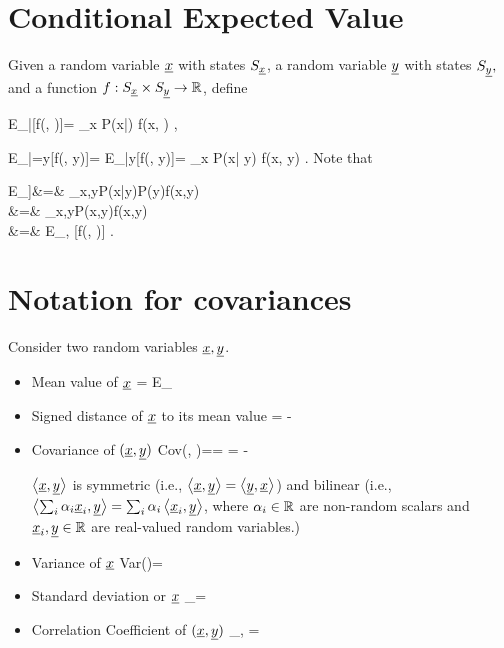 \section{Conditional Expected Value}

Given a random variable ${\underline{x}}$ with states $S_{\underline{x}}$, a random variable ${\underline{y}}$ with states $S_{\underline{y}},$ and a function $f:S_{\underline{x}}\times S_{\underline{y}}\rightarrow { \mathbb{R}}$, define

\beq
E_{\rvx|\rvy}[f(\rvx, \rvy)]=
\sum_x P(x|\rvy) f(x, \rvy)
\;,
\eeq

\beq
E_{\rvx|\rvy=y}[f(\rvx, y)]=
E_{\rvx|y}[f(\rvx, y)]= \sum_x P(x| y) f(x, y)
\;.
\eeq
Note that

\beqa
E_\rvy[E_{\rvx|\rvy}[f(\rvx, \rvy)]]&=&
\sum_{x,y}P(x|y)P(y)f(x,y)
\\&=&
\sum_{x,y}P(x,y)f(x,y)
\\&=&
E_{\rvx, \rvy}[f(\rvx, \rvy)]
\;.
\eeqa



\section{Notation
for covariances}
Consider two random variables ${\underline{x}}, {\underline{y}}$.

\begin{itemize}
\item
Mean value of ${\underline{x}}$
\beq
\av{\rvx}=
E_\rvx[\rvx]
\eeq

\item
Signed distance of ${\underline{x}}$ to its mean value
\beq
\Delta \rvx = \rvx - \av{\rvx}
\eeq

\item
Covariance of $({\underline{x}}, {\underline{y}})$
\beq
Cov(\rvx, \rvy)=\av{\rvx, \rvy}=
\av{\Delta \rvx \Delta \rvy}
=
\av{\rvx\rvy}-\av{\rvx}\av{\rvy}
\eeq

$\left\langle{\underline{x}}, {\underline{y}}\right\rangle$ is symmetric 
(i.e., $\left\langle{\underline{x}}, {\underline{y}}\right\rangle=\left\langle{\underline{y}}, {\underline{x}}\right\rangle$)
and bilinear (i.e.,
$\left\langle\sum_i \alpha_i{\underline{x}}_i, {\underline{y}}\right\rangle
=
\sum_i\alpha_i\left\langle{\underline{x}}_i, {\underline{y}}\right\rangle$, where
$\alpha_i\in { \mathbb{R}}$
are non-random scalars
and ${\underline{x}}_i, {\underline{y}}\in{ \mathbb{R}}$ are 
real-valued random
variables.)

\item
Variance of ${\underline{x}}$
\beq
Var(\rvx)=\av{\rvx, \rvx}
\eeq

\item
Standard deviation or ${\underline{x}}$
\beq
\sigma_\rvx=\sqrt{\av{\rvx, \rvx}}
\eeq

\item
Correlation Coefficient of $({\underline{x}}, {\underline{y}})$
\beq
\rho_{\rvx, \rvy}=
\frac{\av{\rvx, \rvy}}
{\sqrt{\av{\rvx, \rvx}\av{\rvy, \rvy}}}
\eeq
\end{itemize}

